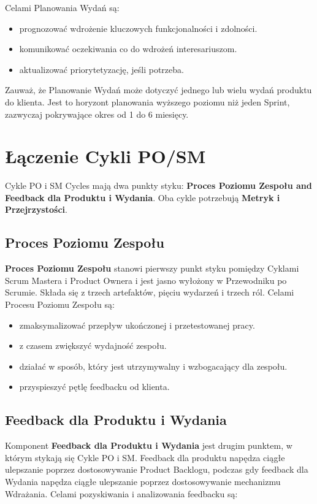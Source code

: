 \documentclass[12pt,a4paper,parskip=full]{scrartcl}
\begin{document}
Celami Planowania Wydań są:

\begin{itemize}
	\item prognozować wdrożenie kluczowych funkcjonalności i zdolności.
	\item komunikować oczekiwania co do wdrożeń interesariuszom.
	\item aktualizować priorytetyzację, jeśli potrzeba.
\end{itemize}

Zauważ, że Planowanie Wydań może dotyczyć jednego lub wielu wydań produktu do klienta. Jest to horyzont planowania wyższego poziomu niż jeden Sprint, zazwyczaj pokrywające okres od 1 do 6 miesięcy.

\section{Łączenie Cykli PO/SM}

Cykle PO i SM Cycles mają dwa punkty styku: \textbf{Proces Poziomu Zespołu and Feedback dla Produktu i Wydania}. Oba cykle potrzebują  \textbf{Metryk i Przejrzystości}.

\subsection{Proces Poziomu Zespołu}

\textbf{Proces Poziomu Zespołu} stanowi pierwszy punkt styku pomiędzy Cyklami Scrum Mastera i Product Ownera i jest jasno wyłożony w Przewodniku po Scrumie. Składa się z trzech artefaktów, pięciu wydarzeń i trzech ról. Celami Procesu Poziomu Zespołu są:

\begin{itemize}
	\item zmaksymalizować przepływ ukończonej i przetestowanej pracy.
	\item z czasem zwiększyć wydajność zespołu.
	\item działać w sposób, który jest utrzymywalny i wzbogacający dla zespołu.
	\item przyspieszyć pętlę feedbacku od klienta.
\end{itemize}

\subsection{Feedback dla Produktu i Wydania}

Komponent \textbf{Feedback dla Produktu i Wydania} jest drugim punktem, w którym stykają się Cykle PO i SM. Feedback dla produktu napędza ciągłe ulepszanie poprzez dostosowywanie Product Backlogu, podczas gdy feedback dla Wydania napędza ciągłe ulepszanie poprzez dostosowywanie mechanizmu Wdrażania. Celami pozyskiwania i analizowania feedbacku są:
\end{document}

